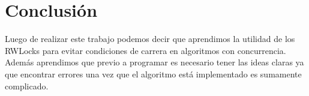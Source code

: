 \section{Conclusión}

Luego de realizar este trabajo podemos decir que aprendimos la utilidad de los RWLocks para evitar condiciones de carrera en algoritmos con concurrencia. 
Además aprendimos que previo a programar es necesario tener las ideas claras ya que encontrar errores una vez que el algoritmo está implementado es sumamente complicado.
